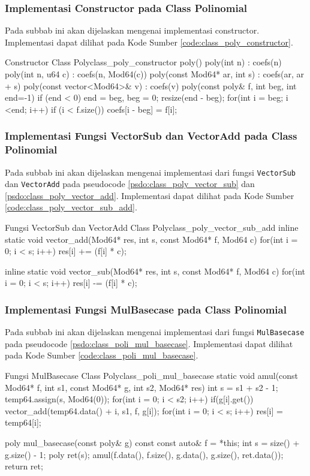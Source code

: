 \subsubsection{Implementasi Constructor pada Class Polinomial}
Pada subbab ini akan dijelaskan mengenai implementasi constructor. Implementasi dapat dilihat pada Kode Sumber \ref{code:class_poly_constructor}.


\begin{code}[firstnumber=1]{Constructor Class Poly}{class_poly_constructor}
	poly() {}
	poly(int n) : coefs(n) {}
	poly(int n, u64 c) : coefs(n, Mod64(c)) {}
	poly(const Mod64* ar, int s) : coefs(ar, ar + s) {}
	poly(const vector<Mod64>& v) : coefs(v) {}
	poly(const poly& f, int beg, int end=-1) {
		if (end < 0) end = beg, beg = 0;
		resize(end - beg);
		for(int i = beg; i <end; i++) if (i < f.size()) coefs[i - beg] = f[i];
	}
\end{code}

\subsubsection{Implementasi Fungsi VectorSub dan VectorAdd pada Class Polinomial}
Pada subbab ini akan dijelaskan mengenai implementasi dari fungsi \texttt{VectorSub} dan \texttt{VectorAdd} pada pseudocode \ref{psdo:class_poly_vector_sub} dan \ref{psdo:class_poly_vector_add}. Implementasi dapat dilihat pada Kode Sumber \ref{code:class_poly_vector_sub_add}.


\begin{code}[firstnumber=1]{Fungsi VectorSub dan VectorAdd Class Poly}{class_poly_vector_sub_add}
	inline static void vector_add(Mod64* res, int s, const Mod64* f, Mod64 c){
		for(int i = 0; i < s; i++) res[i] += (f[i] * c);
	}

	inline static void vector_sub(Mod64* res, int s, const Mod64* f, Mod64 c){
		for(int i = 0; i < s; i++) res[i] -= (f[i] * c);
	}
\end{code}

\subsubsection{Implementasi Fungsi MulBasecase pada Class Polinomial}
Pada subbab ini akan dijelaskan mengenai implementasi dari fungsi \texttt{MulBasecase} pada pseudocode \ref{psdo:class_poli_mul_basecase}. Implementasi dapat dilihat pada Kode Sumber \ref{code:class_poli_mul_basecase}.


\begin{code}[firstnumber=1]{Fungsi MulBasecase Class Poly}{class_poli_mul_basecase}
	static void amul(const Mod64* f, int s1, const Mod64* g, int s2, Mod64* res) {
		int s = s1 + s2 - 1;
		temp64.assign(s, Mod64(0));
		for(int i = 0; i < s2; i++) if(g[i].get()) vector_add(temp64.data() + i, s1, f, g[i]);
		for(int i = 0; i < s; i++) res[i] = temp64[i];
	}
	
	poly mul_basecase(const poly& g) const {
		const auto& f = *this;
		int s = size() + g.size() - 1;
		poly ret(s);
		amul(f.data(), f.size(), g.data(), g.size(), ret.data());
		return ret;
	}
\end{code}

